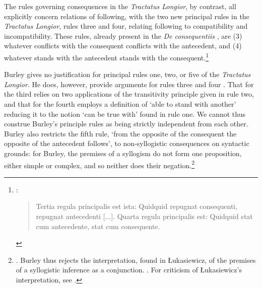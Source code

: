 \documentclass[]{birkjour}
\begin{document}
The rules governing consequences in the \textit{Tractatus Longior}, by contrast, all explicitly concern relations of following, with the two new principal rules in the \textit{Tractatus Longior}, rules three and four, relating following to compatibility and incompatibility. These rules, already present in the \textit{De consequentiis} \autocite[p. 133, par. 88]{Green-Pedersen1980b}, are (3) whatever conflicts with the consequent conflicts with the antecedent, and (4) whatever stands with the antecedent stands with the consequent.\footnote{\autocite[pp. 63.1-2, 7-8]{BurleyDPAL}: \begin{quote}
		Tertia regula principalis est ista: Quidquid repugnat consequenti, repugnat antecedenti [...]. Quarta regula principalis est: Quidquid stat cum antecedente, stat cum consequente.
	\end{quote}} 

Burley gives no justification for principal rules one, two, or five of the \textit{Tractatus Longior}. He does, however, provide arguments for rules three and four \autocite[p. 63.1-14]{BurleyDPAL}. That for the third relies on two applications of the transitivity principle given in rule two, and that for the fourth employs a definition of `able to stand with another' reducing it to the notion `can be true with' found in rule one. We cannot thus construe Burley's principle rules as being strictly independent from each other. Burley also restricts the fifth rule, `from the opposite of the consequent the opposite of the antecedent follows', to non-syllogistic consequences on syntactic grounds: for Burley, the premises of a syllogism do not form one proposition, either simple or complex, and so neither does their negation.\footnote{\autocite[pp. 65.3-17; 207.31-208.9]{BurleyDPAL}. Burley thus rejects the interpretation, found in \L{}ukasiewicz, of the premises of a syllogistic inference as a conjunction. \autocite{Lukasiewicz1957}. For criticism of \L{}ukasiewicz's interpretation, see \autocite{Corcoran1974}.}
\end{document}
